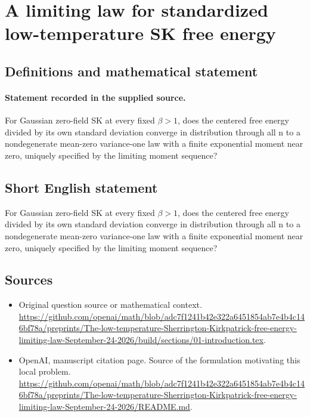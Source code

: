 \documentclass[11pt]{article}
\begin{document}
\section*{A limiting law for standardized low-temperature SK free energy}\label{30007392}
\subsection{Definitions and mathematical statement}
\paragraph{Statement recorded in the supplied source.}
For Gaussian zero-field SK at every fixed $\beta >1$, does the centered free energy divided by its own standard deviation converge in distribution through all n to a nondegenerate mean-zero variance-one law with a finite exponential moment near zero, uniquely specified by the limiting moment sequence?
\subsection{Short English statement}
For Gaussian zero-field SK at every fixed $\beta >1$, does the centered free energy divided by its own standard deviation converge in distribution through all n to a nondegenerate mean-zero variance-one law with a finite exponential moment near zero, uniquely specified by the limiting moment sequence?
\subsection{Sources}
\begin{itemize}
\item[S1] Original question source or mathematical context.
\url{https://github.com/openai/math/blob/adc7f1241b42e322a6451854ab7e4b4c146bf78a/preprints/The-low-temperature-Sherrington-Kirkpatrick-free-energy-limiting-law-September-24-2026/build/sections/01-introduction.tex}.
\item[S2] OpenAI, manuscript citation page. Source of the formulation motivating this local problem.
\url{https://github.com/openai/math/blob/adc7f1241b42e322a6451854ab7e4b4c146bf78a/preprints/The-low-temperature-Sherrington-Kirkpatrick-free-energy-limiting-law-September-24-2026/README.md}.
\end{itemize}
\end{document}
